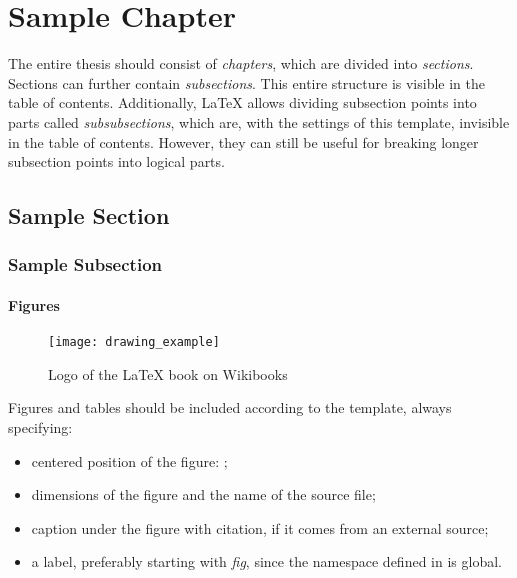 \chapter{Sample Chapter}
\label{chpt:sample-chapter}

The entire thesis should consist of \emph{chapters}, which are divided
into \emph{sections}. Sections can further
contain \emph{subsections}. This entire structure is visible
in the table of contents. Additionally, LaTeX allows dividing subsection
points into parts called \emph{subsubsections}, which are, with the settings
of this template, invisible in the table of contents. However, they can still
be useful for breaking longer subsection points into logical parts.

\section{Sample Section}

\subsection{Sample Subsection}

\subsubsection{Figures}

\begin{figure}[!htb]
    \centering
    \texttt{[image: drawing\_example]}
    \caption{Logo of the LaTeX book on Wikibooks
    \cite{book:latex}}
    \label{fig:sample-figure}
\end{figure}

Figures and tables should be included according to the template, always specifying:

\begin{itemize}
    \item centered position of the figure: ;
    \item dimensions of the figure and the name of the source file;
    \item caption under the figure with citation, if it comes
    from an external source;
    \item a label, preferably starting with \emph{fig}, since
    the namespace defined in  is
    global.
\end{itemize}


